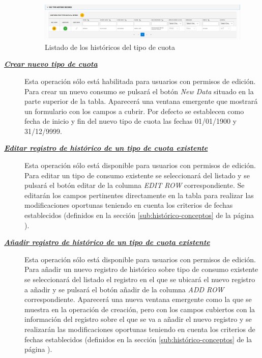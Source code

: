 \begin{description}
\begin{figure}[H]
  \centering
  \includegraphics[width=\textwidth]{imaxes/listado-historicos-tipo-cuota.png}
  \caption{Listado de los históricos del tipo de cuota}
  \label{fig:listado-historicos-tipo-cuota}
\end{figure}


\item[\underline{\textsl{\textbf{Crear nuevo tipo de cuota}}}] Esta operación sólo está habilitada para usuarios con permisos de edición.
Para crear un nuevo consumo se pulsará el botón \textit{New Data} situado en la parte superior de la tabla. Aparecerá una ventana emergente que mostrará un formulario con los campos a cubrir. Por defecto se establecen como fecha de inicio y fin del nuevo tipo de cuota las fechas 01/01/1900 y 31/12/9999.

\item[\underline{\textsl{\textbf{Editar registro de histórico de un tipo de cuota existente}}}] Esta operación sólo está disponible para usuarios con permisos de edición.
Para editar un tipo de consumo existente se seleccionará del listado y se pulsará el botón editar de la columna \textit{EDIT ROW} correspondiente. Se editarán los campos pertinentes directamente en la tabla para realizar las modificaciones oportunas teniendo en cuenta los criterios de fechas establecidos (definidos en la sección \ref{sub:histórico-conceptos} de la página \pageref{sub:histórico-conceptos}).

\item[\underline{\textsl{\textbf{Añadir registro de histórico de un tipo de cuota existente}}}] Esta operación sólo está disponible para usuarios con permisos de edición.
Para añadir un nuevo registro de histórico sobre tipo de consumo existente se seleccionará del listado el registro en el que se ubicará el nuevo registro a añadir 
y se pulsará el botón añadir de la columna \textit{ADD ROW} correspondiente. Aparecerá una nueva ventana emergente como la que se muestra en la operación de creación, pero con los campos cubiertos con la información del registro sobre el que se va a añadir el nuevo registro y se realizarán las modificaciones oportunas teniendo en cuenta los criterios de fechas establecidos (definidos en la sección \ref{sub:histórico-conceptos} de la página \pageref{sub:histórico-conceptos}).


\end{description}
